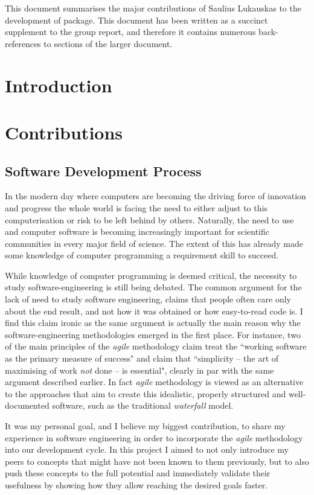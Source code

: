 This document summarises the major contributions of Saulius Lukauskas
to the development of \means{} package.
This document has been written as a succinct supplement to the group report, and therefore it contains numerous back-references to sections of the larger document.

\section{Introduction}

\section{Contributions}
\subsection{Software Development Process}
In the modern day where computers are becoming the driving force of innovation and progress the whole world is facing the need to either adjust to this computerisation or risk to be left behind by others.
Naturally, the need to use and computer software is becoming increasingly important for scientific communities in every major field of science. The extent of this has already made some knowledge of computer programming a requirement skill to succeed.

While knowledge of computer programming is deemed critical, the necessity to study software-engineering is still being debated. 
The common argument for the lack of need to study software engineering, claims that people often care only about the end result, and not how it was obtained or how easy-to-read code is. 
I find this claim ironic as the same argument is actually the main reason why the software-engineering methodologies emerged in the first place. 
For instance, two of the main principles of the \emph{agile} methodology\cite{_manifesto_????} claim treat the ``working software as the primary measure of success" and claim that ``simplicity -- the art of maximising of work \emph{not} done -- is essential"\cite{paulk_agile_2002}, clearly in par with the same argument described earlier. 
In fact \emph{agile} methodology is viewed as an alternative to the approaches that aim to create this idealistic, properly structured and well-documented software, such as the traditional \emph{waterfall} model.

It was my personal goal, and I believe my biggest contribution, to share my experience in software engineering in order to incorporate the \emph{agile} methodology into our development cycle. 
In this project I aimed to not only introduce my peers to concepts that might have not been known to them previously, but to also push these concepts to the full potential and immediately validate their usefulness by showing how they allow reaching the desired goals faster. 

